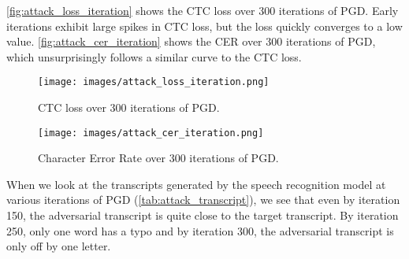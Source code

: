 \autoref{fig:attack_loss_iteration} shows the CTC loss over 300 iterations of
PGD. Early iterations exhibit large spikes in CTC loss, but the loss quickly
converges to a low value. \autoref{fig:attack_cer_iteration} shows the CER over
300 iterations of PGD, which unsurprisingly follows a similar curve to the CTC
loss.

\begin{figure}[h]
  \centering
  \texttt{[image: images/attack\_loss\_iteration.png]}
  \caption{CTC loss over 300 iterations of PGD.}
  \label{fig:attack_loss_iteration}
\end{figure}

\begin{figure}[h]
  \centering
  \texttt{[image: images/attack\_cer\_iteration.png]}
  \caption{Character Error Rate over 300 iterations of PGD.}
  \label{fig:attack_cer_iteration}
\end{figure}

When we look at the transcripts generated by the speech recognition model at
various iterations of PGD (\autoref{tab:attack_transcript}), we see that even by
iteration 150, the adversarial transcript is quite close to the target
transcript. By iteration 250, only one word has a typo and by iteration 300, the
adversarial transcript is only off by one letter.

